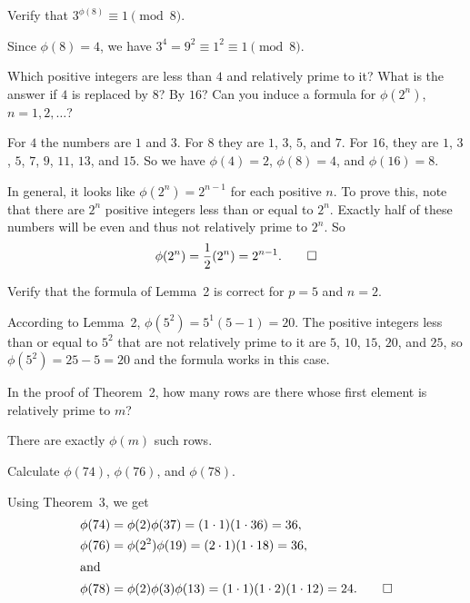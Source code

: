  Verify that $3^{\phi(8)}\equiv1\pmod8$.
\begin{solution}
  Since $\phi(8) = 4$, we have $3^4 = 9^2 \equiv 1^2 \equiv 1\pmod8$.
\end{solution}

 Which positive integers are less than $4$ and relatively
prime to it? What is the answer if $4$ is replaced by $8$? By $16$?
Can you induce a formula for $\phi(2^n)$, $n = 1,2,\dots$?
\begin{solution}
  For $4$ the numbers are $1$ and $3$. For $8$ they are $1$, $3$, $5$,
  and $7$. For $16$, they are $1$, $3$, $5$, $7$, $9$, $11$, $13$, and
  $15$. So we have $\phi(4) = 2$, $\phi(8) = 4$, and $\phi(16) = 8$.

  In general, it looks like $\phi(2^n) = 2^{n-1}$ for each positive
  $n$. To prove this, note that there are $2^n$ positive integers less
  than or equal to $2^n$. Exactly half of these numbers will be even
  and thus not relatively prime to $2^n$. So
  \begin{equation*}
    \phi(2^n) = \frac12(2^n) = 2^{n-1}. \qedhere
  \end{equation*}
\end{solution}

 Verify that the formula of Lemma~2 is correct for $p = 5$
and $n = 2$.
\begin{solution}
  According to Lemma~2, $\phi(5^2) = 5^1(5 - 1) = 20$. The positive
  integers less than or equal to $5^2$ that are not relatively prime
  to it are $5$, $10$, $15$, $20$, and $25$, so
  $\phi(5^2) = 25 - 5 = 20$ and the formula works in this case.
\end{solution}

 In the proof of Theorem~2, how many rows are there whose
first element is relatively prime to $m$?
\begin{solution}
  There are exactly $\phi(m)$ such rows.
\end{solution}

 Calculate $\phi(74)$, $\phi(76)$, and $\phi(78)$.
\begin{solution}
  Using Theorem~3, we get
  \begin{align*}
    \phi(74) &= \phi(2)\phi(37) = (1\cdot1)(1\cdot36) = 36, \\
    \phi(76) &= \phi(2^2)\phi(19)
               = (2\cdot1)(1\cdot18) = 36, \\
    \intertext{and}
    \phi(78) &= \phi(2)\phi(3)\phi(13)
               = (1\cdot1)(1\cdot2)(1\cdot12) = 24. \qedhere
  \end{align*}
\end{solution}

